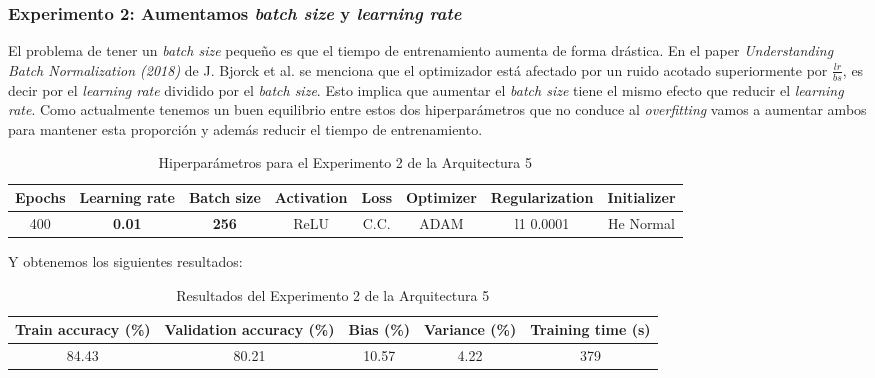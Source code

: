 \documentclass{article}
\begin{document}
		\subsubsection{Experimento 2: Aumentamos \textit{batch size} y \textit{learning rate}}
		\label{d-s-a5-e2}
			El problema de tener un \textit{batch size} peque\~no es que el tiempo de entrenamiento aumenta de forma dr\'astica. En el paper \textit{Understanding Batch Normalization (2018)} de J. Bjorck et al. se menciona que el optimizador est\'a afectado por un ruido acotado superiormente por $\frac{lr}{bs}$, es decir por el \textit{learning rate} dividido por el \textit{batch size}. Esto implica que aumentar el \textit{batch size} tiene el mismo efecto que reducir el \textit{learning rate}. Como actualmente tenemos un buen equilibrio entre estos dos hiperpar\'ametros que no conduce al \textit{overfitting} vamos a aumentar ambos para mantener esta proporci\'on y adem\'as reducir el tiempo de entrenamiento.
		
			\begin{table}[!h]
				\begin{center}
					\begin{tabular}{| c | c | c | c | c | c | c | c |}
						\textbf{Epochs} & \textbf{Learning rate} & \textbf{Batch size} & \textbf{Activation} & \textbf{Loss} & \textbf{Optimizer} & \textbf{Regularization} & \textbf{Initializer}\\ \hline
						 400 & \textbf{0.01} & \textbf{256} & ReLU & C.C. & ADAM & l1 0.0001 & He Normal
					\end{tabular}
					\caption{Hiperpar\'ametros para el Experimento 2 de la Arquitectura 5}
					\label{tab:hip-d-a5-e2}
				\end{center}
			\end{table}
			\newpage
			Y obtenemos los siguientes resultados:
			\begin{table}[!h]
				\begin{center}
					\begin{tabular}{| c | c | c | c | c |}
						\textbf{Train accuracy (\%)} & \textbf{Validation accuracy (\%)} & \textbf{Bias (\%)} & \textbf{Variance (\%)} & \textbf{Training time (s)} \\ \hline
						84.43 & 80.21 & 10.57 & 4.22 & 379\\ \hline
					\end{tabular}
					\caption{Resultados del Experimento 2 de la Arquitectura 5}
					\label{tab:res-d-a5-e2}
				\end{center}
			\end{table}
		    
\end{document}
